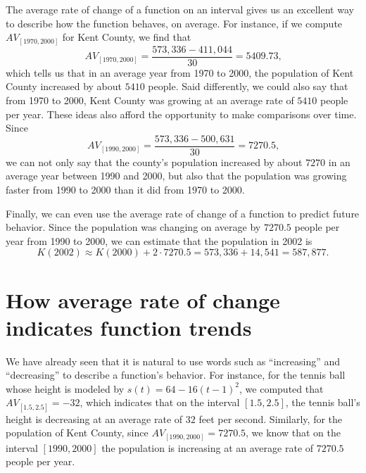 \documentclass[nooutcomes]{ximera}
\begin{document}
The average rate of change of a function on an interval gives us an excellent way to describe how the function behaves, on average.  For instance, if we compute $AV_{[1970,2000]}$ for Kent County, we find that%
\begin{equation*}
AV_{[1970,2000]} = \frac{573,336 - 411,044}{30} = 5409.73\text{,}
\end{equation*}
which tells us that in an average year from 1970 to 2000, the population of Kent County increased by about $5410$ people.  Said differently, we could also say that from 1970 to 2000, Kent County was growing at an average rate of $5410$ people per year.  These ideas also afford the opportunity to make comparisons over time.  Since%
\begin{equation*}
AV_{[1990,2000]} = \frac{573,336 - 500,631}{30} = 7270.5\text{,}
\end{equation*}
we can not only say that the county's population increased by about $7270$ in an average year between 1990 and 2000, but also that the population was growing faster from 1990 to 2000 than it did from 1970 to 2000.%

Finally, we can even use the average rate of change of a function to predict future behavior.  Since the population was changing on average by $7270.5$ people per year from 1990 to 2000, we can estimate that the population in 2002 is%
\begin{equation*}
K(2002) \approx K(2000) + 2 \cdot 7270.5 = 573,336 + 14,541 = 587,877\text{.}
\end{equation*}



\section{How average rate of change indicates function trends}

We have already seen that it is natural to use words such as ``increasing'' and ``decreasing'' to describe a function's behavior.  For instance, for the tennis ball whose height is modeled by $s(t) = 64 - 16(t-1)^2$, we computed that $AV_{[1.5,2.5]} = -32$, which indicates that on the interval $[1.5,2.5]$, the tennis ball's height is decreasing at an average rate of $32$ feet per second.  Similarly, for the population of Kent County, since $AV_{[1990,2000]} = 7270.5$, we know that on the interval $[1990,2000]$ the population is increasing at an average rate of $7270.5$ people per year.
\end{document}
